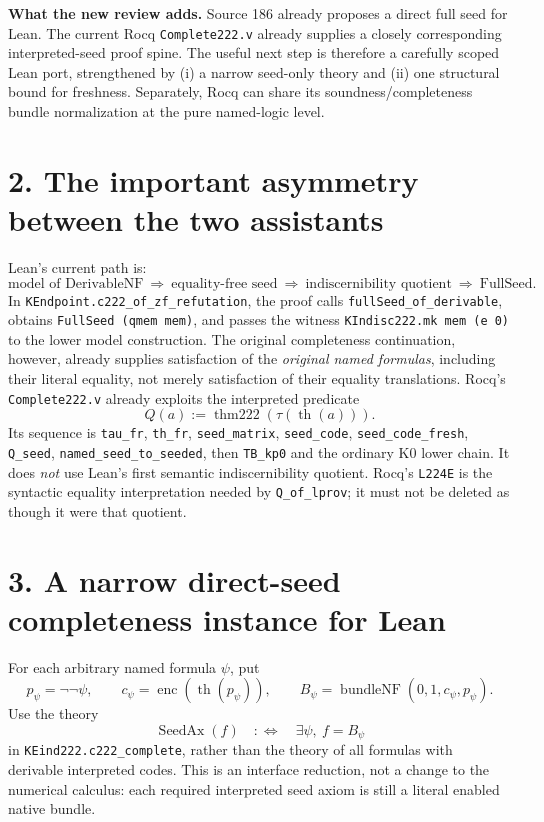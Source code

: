\documentclass[10pt]{article}
\newcommand{\code}[1]{\texttt{#1}}
\begin{document}
\textbf{What the new review adds.} Source 186 already proposes a direct full seed for Lean. The current Rocq \code{Complete222.v} already supplies a closely corresponding interpreted-seed proof spine. The useful next step is therefore a carefully scoped Lean port, strengthened by (i) a narrow seed-only theory and (ii) one structural bound for freshness. Separately, Rocq can share its soundness/completeness bundle normalization at the pure named-logic level.

\section*{2. The important asymmetry between the two assistants}
Lean's current path is:
\[
\text{model of DerivableNF}\ \Longrightarrow\ \text{equality-free seed}\
\Longrightarrow\ \text{indiscernibility quotient}\ \Longrightarrow\ \text{FullSeed}.
\]
In \code{KEndpoint.c222\_of\_zf\_refutation}, the proof calls
\code{fullSeed\_of\_derivable}, obtains \code{FullSeed (qmem mem)}, and passes the witness
\code{KIndisc222.mk mem (e 0)} to the lower model construction.
The original completeness continuation, however, already supplies satisfaction of the
\emph{original named formulas}, including their literal equality, not merely satisfaction of their equality translations.
\newpage
Rocq's \code{Complete222.v} already exploits the interpreted predicate
\[
Q(a) := \operatorname{thm222}(\tau(\operatorname{th}(a))).
\]
Its sequence is \code{tau\_fr}, \code{th\_fr}, \code{seed\_matrix},
\code{seed\_code}, \code{seed\_code\_fresh}, \code{Q\_seed},
\code{named\_seed\_to\_seeded}, then \code{TB\_kp0} and the ordinary K0 lower chain.
It does \emph{not} use Lean's first semantic indiscernibility quotient. Rocq's
\code{L224E} is the syntactic equality interpretation needed by \code{Q\_of\_lprov}; it must not be deleted as though it were that quotient.

\section*{3. A narrow direct-seed completeness instance for Lean}
For each arbitrary named formula $\psi$, put
\[
p_\psi=\neg\neg\psi,\qquad c_\psi=\operatorname{enc}(\operatorname{th}(p_\psi)),
\qquad B_\psi=\operatorname{bundleNF}(0,1,c_\psi,p_\psi).
\]
Use the theory
\[
\operatorname{SeedAx}(f)\quad:\!\!\Longleftrightarrow\quad \exists\psi,\ f=B_\psi
\]
in \code{KEind222.c222\_complete}, rather than the theory of all formulas with derivable interpreted codes. This is an interface reduction, not a change to the numerical calculus: each required interpreted seed axiom is still a literal enabled native bundle.
\end{document}
